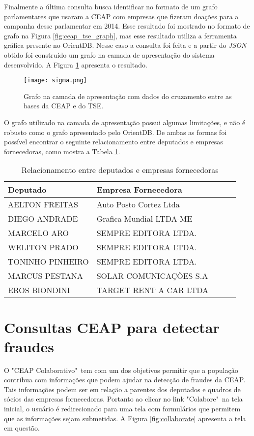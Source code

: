 Finalmente a última consulta busca identificar no formato de um grafo parlamentares que usaram a CEAP com empresas que fizeram doações para a campanha desse parlamentar em 2014. Esse resultado foi mostrado no formato de grafo na Figura \ref{fig:ceap_tse_graph}, mas esse resultado utiliza a ferramenta gráfica presente no OrientDB. Nesse caso a consulta foi feita e a partir do \textit{JSON} obtido foi construído um grafo na camada de apresentação do sistema desenvolvido. A Figura \ref{fig:sigma} apresenta o resultado.

\begin{figure}[H]
\centering
\texttt{[image: sigma.png]}
\caption{Grafo na camada de apresentação com dados do cruzamento entre as bases da CEAP e do TSE.}
\label{fig:sigma}
\end{figure}

O grafo utilizado na camada de apresentação possui algumas limitações, e não é robusto como o grafo apresentado pelo OrientDB. De ambas as formas foi possível encontrar o seguinte relacionamento entre deputados e empresas fornecedoras, como mostra a Tabela \ref{table:relation_deputies_companies}.

\begin{table}[h!]
\centering
\caption{Relacionamento entre deputados e empresas fornecedoras}
\begin{tabular}{|l|l|l|l|l|}
\hline
Deputado & Empresa Fornecedora \\ \hline
AELTON FREITAS & Auto Posto Cortez Ltda \\ \hline
DIEGO ANDRADE & Grafica Mundial LTDA-ME \\ \hline
MARCELO ARO & SEMPRE EDITORA LTDA. \\ \hline
WELITON PRADO & SEMPRE EDITORA LTDA. \\ \hline
TONINHO PINHEIRO & SEMPRE EDITORA LTDA. \\ \hline
MARCUS PESTANA & SOLAR COMUNICAÇÕES S.A \\ \hline
EROS BIONDINI & TARGET RENT A CAR LTDA \\ \hline
\end{tabular}
\label{table:relation_deputies_companies}
\end{table}

\section{Consultas CEAP para detectar fraudes}

O "CEAP Colaborativo"\ tem com um dos objetivos permitir que a população contribua com informações que podem ajudar na detecção de fraudes da CEAP. Tais informações podem ser em relação a parentes dos deputados e quadros de sócios das empresas fornecedoras. Portanto ao clicar no link "Colabore"\ na tela inicial, o usuário é redirecionado para uma tela com formulários que permitem que as informações sejam submetidas. A Figura \ref{fig:collaborate} apresenta a tela em questão.

